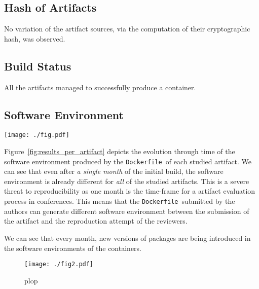 \documentclass[sigconf,natbib=false]{acmart}
\newcommand{\df}{\texttt{Dockerfile}}
\newcommand{\todo}[1]{{\color{red}{TODO: #1}}}
\begin{document}
\subsection{Hash of Artifacts}

No variation of the artifact sources, via the computation of their cryptographic hash, was observed.

\subsection{Build Status}

All the artifacts managed to successfully produce a container.

\subsection{Software Environment}

\begin{figure*}
  \centering
  \texttt{[image: ./fig.pdf]}
  \caption{
    Evolution of the packages in the software environment of each container through time.
    Each container has been rebuilt once a month.
    The color of the bar corresponds to the month when a specific version of a package has been introduced in the software environment.
    We can see that the proportion of package versions similar to the versions in the initial build is decreasing throught the months.
  }
  \label{fig:results_per_artifact}
\end{figure*}

Figure~\ref{fig:results_per_artifact} depicts the evolution through time of the software environment produced by the \df\ of each studied artifact.
We can see that even after \emph{a single month} of the initial build, the software environment is already different for \emph{all} of the studied artifacts.
This is a severe threat to reproducibility as one month is the time-frame for a artifact evaluation process in conferences.
This means that the \df\ submitted by the authors can generate different software environment between the submission of the artifact and the reproduction attempt of the reviewers.


We can see that every month, new versions of packages are being introduced in the software environments of the containers.



\begin{figure}
  \centering
  \texttt{[image: ./fig2.pdf]}
  \caption{
    plop
  }\label{fig:results_per_tool}
\end{figure}
\end{document}
